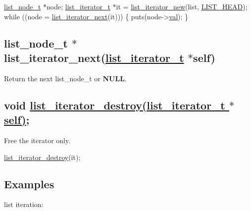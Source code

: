 \begin{DoxyCode}
\hyperlink{structlist__node}{list\_node\_t} *node;
\hyperlink{structlist__iterator__t}{list\_iterator\_t} *it = \hyperlink{list_8h_a3c956afda343b4a6aaf68fbd4b446733}{list\_iterator\_new}(list, 
      \hyperlink{list_8h_a2c3af7de0b7ab9c3a84fbc039e75ec66abdf0fd732c6a91b57c5cbea177f1ae00}{LIST\_HEAD});
\textcolor{keywordflow}{while} ((node = \hyperlink{list_8h_a2e5db981e32d3aef49ea79505a0615a6}{list\_iterator\_next}(it))) \{
  puts(node->\hyperlink{structlist__node_a129de89b4c110fa54377ef16ab128ce0}{val});
\}
\end{DoxyCode}


\subsection*{list\+\_\+node\+\_\+t $\ast$list\+\_\+iterator\+\_\+next(\hyperlink{structlist__iterator__t}{list\+\_\+iterator\+\_\+t} $\ast$self)}

Return the next {\ttfamily list\+\_\+node\+\_\+t} or {\bfseries N\+U\+LL}.

\subsection*{void \hyperlink{list__iterator_8c_ad16fa29ddbb444070ea65f871e1c0ba2}{list\+\_\+iterator\+\_\+destroy(list\+\_\+iterator\+\_\+t $\ast$self)};}

Free the iterator only.


\begin{DoxyCode}
\hyperlink{list_8h_ad16fa29ddbb444070ea65f871e1c0ba2}{list\_iterator\_destroy}(it);
\end{DoxyCode}


\subsection*{Examples}

list iteration\+:


